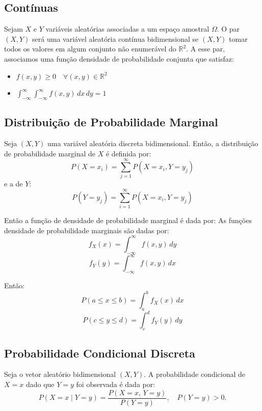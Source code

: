 \documentclass{article}
\begin{document}
\subsection{Contínuas}
Sejam $X$ e $Y$ variáveis aleatórias associadas a um espaço amostral $\Omega$. O par $(X, Y)$ será uma variável aleatória contínua bidimensional se $(X, Y)$ tomar todos os valores em algum conjunto não enumerável do $\mathbb{R}^2$. A esse par, associamos uma função densidade de probabilidade conjunta que satisfaz:

\begin{itemize}
    \item $f(x, y) \geq 0 \quad \forall (x, y) \in \mathbb{R}^2$
    \item $\displaystyle \int_{-\infty}^{\infty} \int_{-\infty}^{\infty} f(x, y) \, dx \, dy = 1$
\end{itemize}

\subsection{Distribuição de Probabilidade Marginal}
Seja $(X, Y)$ uma variável aleatória discreta bidimensional.  
Então, a distribuição de probabilidade marginal de $X$ é definida por:
\begin{equation}
    P(X = x_i) = \sum_{j=1}^{\infty} P(X = x_i, Y = y_j)
\end{equation}
e a de $Y$:
\begin{equation}
    P(Y = y_j) = \sum_{i=1}^{\infty} P(X = x_i, Y = y_j)
\end{equation}

Então a função de densidade de probabilidade marginal é dada por:
As funções densidade de probabilidade marginais são dadas por:
    $$
    f_X(x) = \int_{-\infty}^{\infty} f(x, y) \, dy
    $$
    $$
    f_Y(y) = \int_{-\infty}^{\infty} f(x, y) \, dx
    $$

Então:
    $$
    P(a \leq x \leq b) = \int_a^b f_X(x) \, dx
    $$
    $$
    P(c \leq y \leq d) = \int_c^d f_Y(y) \, dy
    $$

\subsection{Probabilidade Condicional Discreta}
Seja o vetor aleatório bidimensional $(X, Y)$. A probabilidade condicional de $X = x$ dado que $Y = y$ foi observada é dada por:
    $$
    P(X = x \mid Y = y) = \frac{P(X = x, \, Y = y)}{P(Y = y)}, \quad P(Y = y) > 0.
    $$
\end{document}
